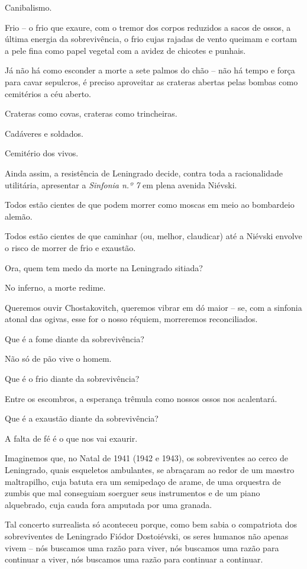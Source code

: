 Canibalismo.

Frio -- o frio que exaure, com o tremor dos corpos reduzidos a sacos de
ossos, a última energia da sobrevivência, o frio cujas rajadas de vento
queimam e cortam a pele fina como papel vegetal com a avidez de chicotes
e punhais.

Já não há como esconder a morte a sete palmos do chão -- não há tempo e
força para cavar sepulcros, é preciso aproveitar as crateras abertas
pelas bombas como cemitérios a céu aberto.

Crateras como covas, crateras como trincheiras.

Cadáveres e soldados.

Cemitério dos vivos.

Ainda assim, a resistência de Leningrado decide, contra toda a
racionalidade utilitária, apresentar a \emph{Sinfonia n.º 7} em plena
avenida Niévski.

Todos estão cientes de que podem morrer como moscas em meio ao
bombardeio alemão.

Todos estão cientes de que caminhar (ou, melhor, claudicar) até a
Niévski envolve o risco de morrer de frio e exaustão.

Ora, quem tem medo da morte na Leningrado sitiada?

No inferno, a morte redime.

Queremos ouvir Chostakovitch, queremos vibrar em dó maior -- se, com a
sinfonia atonal das ogivas, esse for o nosso réquiem, morreremos
reconciliados.

Que é a fome diante da sobrevivência?

Não só de pão vive o homem.

Que é o frio diante da sobrevivência?

Entre os escombros, a esperança trêmula como nossos ossos nos
acalentará.

Que é a exaustão diante da sobrevivência?

A falta de fé é o que nos vai exaurir.

Imaginemos que, no Natal de 1941 (1942 e 1943), os sobreviventes ao
cerco de Leningrado, quais esqueletos ambulantes, se abraçaram ao redor
de um maestro maltrapilho, cuja batuta era um semipedaço de arame, de
uma orquestra de zumbis que mal conseguiam soerguer seus instrumentos e
de um piano alquebrado, cuja cauda fora amputada por uma granada.

Tal concerto surrealista só aconteceu porque, como bem sabia o
compatriota dos sobreviventes de Leningrado Fiódor Dostoiévski, os seres
humanos não apenas vivem -- nós buscamos uma razão para viver, nós
buscamos uma razão para continuar a viver, nós buscamos uma razão para
continuar a continuar.

